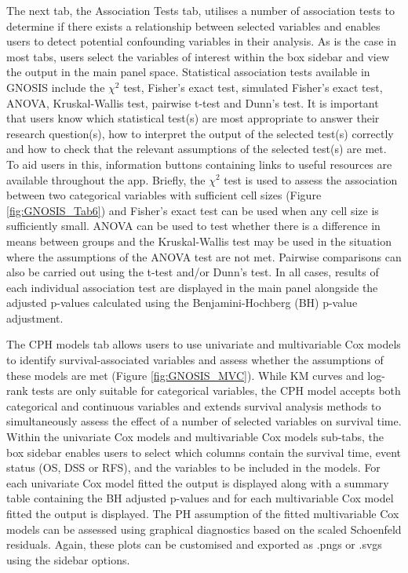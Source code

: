 The next tab, the Association Tests tab, utilises a number of association tests to determine if there exists a relationship between selected variables and enables users to detect potential confounding variables in their analysis. As is the case in most tabs, users select the variables of interest within the box sidebar and view the output in the main panel space. Statistical association tests available in GNOSIS include the $\chi^{2}$ test, Fisher’s exact test, simulated Fisher’s exact test, ANOVA, Kruskal-Wallis test, pairwise t-test and Dunn’s test. It is important that users know which statistical test(s) are most appropriate to answer their research question(s), how to interpret the output of the selected test(s) correctly and how to check that the relevant assumptions of the selected test(s) are met. To aid users in this, information buttons containing links to useful resources are available throughout the app. Briefly, the $\chi^{2}$ test is used to assess the association between two categorical variables with sufficient cell sizes (Figure \ref{fig:GNOSIS_Tab6}) and Fisher’s exact test can be used when any cell size is sufficiently small. ANOVA can be used to test whether there is a difference in means between groups and the Kruskal-Wallis test may be used in the situation where the assumptions of the ANOVA test are not met. Pairwise comparisons can also be carried out using the t-test and/or Dunn’s test. In all cases, results of each individual association test are displayed in the main panel alongside the adjusted p-values calculated using the Benjamini-Hochberg (BH) p-value adjustment. 

The CPH models tab allows users to use univariate and multivariable Cox models to identify survival-associated variables and assess whether the assumptions of these models are met (Figure \ref{fig:GNOSIS_MVC}). While KM curves and log-rank tests are only suitable for categorical variables, the CPH model accepts both categorical and continuous variables and extends survival analysis methods to simultaneously assess the effect of a number of selected variables on survival time. Within the univariate Cox models and multivariable Cox models sub-tabs, the box sidebar enables users to select which columns contain the survival time, event status (OS, DSS or RFS), and the variables to be included in the models. For each univariate Cox model fitted the output is displayed along with a summary table containing the BH adjusted p-values and for each multivariable Cox model fitted the output is displayed. The PH assumption of the fitted multivariable Cox models can be assessed using graphical diagnostics based on the scaled Schoenfeld residuals. Again, these plots can be customised and exported as .pngs or .svgs using the sidebar options. 


